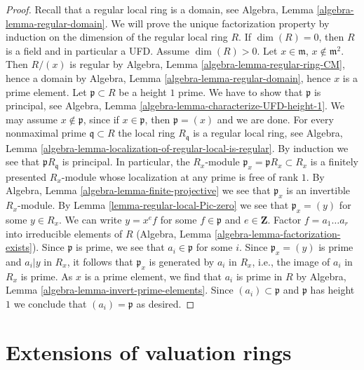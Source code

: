 \begin{proof}
Recall that a regular local ring is a domain, see
Algebra, Lemma \ref{algebra-lemma-regular-domain}.
We will prove the unique factorization property
by induction on the dimension of the regular local ring $R$.
If $\dim(R) = 0$, then $R$ is a field and in particular a UFD.
Assume $\dim(R) > 0$. Let $x \in \mathfrak m$, $x \not \in \mathfrak m^2$.
Then $R/(x)$ is regular by Algebra, Lemma \ref{algebra-lemma-regular-ring-CM},
hence a domain by
Algebra, Lemma \ref{algebra-lemma-regular-domain},
hence $x$ is a prime element.
Let $\mathfrak p \subset R$ be a height $1$ prime. We have
to show that $\mathfrak p$ is principal, see
Algebra, Lemma \ref{algebra-lemma-characterize-UFD-height-1}.
We may assume $x \not \in \mathfrak p$, since if $x \in \mathfrak p$,
then $\mathfrak p = (x)$ and we are done.
For every nonmaximal prime $\mathfrak q \subset R$
the local ring $R_\mathfrak q$ is a regular local ring, see
Algebra, Lemma \ref{algebra-lemma-localization-of-regular-local-is-regular}.
By induction we see that $\mathfrak pR_\mathfrak q$ is principal.
In particular, the $R_x$-module $\mathfrak p_x = \mathfrak pR_x \subset R_x$
is a finitely presented $R_x$-module whose localization at
any prime is free of rank $1$. 
By Algebra, Lemma \ref{algebra-lemma-finite-projective}
we see that $\mathfrak p_x$ is an invertible $R_x$-module.
By Lemma \ref{lemma-regular-local-Pic-zero} we see that
$\mathfrak p_x = (y)$ for some $y \in R_x$.
We can write $y = x^e f$ for some $f \in \mathfrak p$ and $e \in \mathbf{Z}$.
Factor $f = a_1 \ldots a_r$ into irreducible elements of $R$
(Algebra, Lemma \ref{algebra-lemma-factorization-exists}).
Since $\mathfrak p$ is prime, we see that $a_i \in \mathfrak p$
for some $i$. Since $\mathfrak p_x = (y)$ is prime and
$a_i | y$ in $R_x$, it follows that $\mathfrak p_x$ is generated by
$a_i$ in $R_x$, i.e., the image of $a_i$ in $R_x$ is prime.
As $x$ is a prime element, we find that $a_i$ is prime in $R$ by
Algebra, Lemma \ref{algebra-lemma-invert-prime-elements}.
Since $(a_i) \subset \mathfrak p$ and $\mathfrak p$ has height
$1$ we conclude that $(a_i) = \mathfrak p$ as desired.
\end{proof}





\section{Extensions of valuation rings}
\label{section-valuation-rings}

